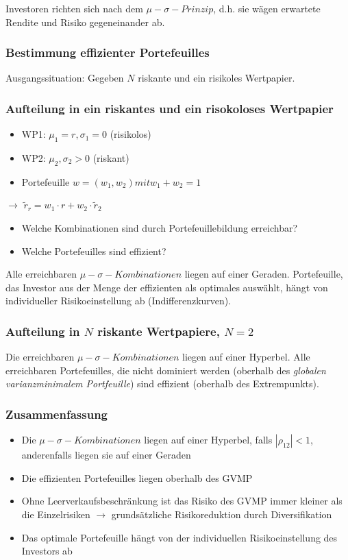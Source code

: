 Investoren richten sich nach dem \(\mu-\sigma-Prinzip\), d.h. sie wägen erwartete Rendite und Risiko gegeneinander ab.

\subsubsection{Bestimmung effizienter Portefeuilles}

Ausgangssituation: Gegeben \(N\) riskante und ein risikoles Wertpapier.

\subsubsection{Aufteilung in ein riskantes und ein risokoloses Wertpapier}
\begin{itemize}
	\item WP1: \(\mu_1 = r, \sigma_1 = 0\) (risikolos)
	\item WP2: \(\mu_2, \sigma_2 > 0\) (riskant)
	\item Portefeuille \(w = (w_1, w_2) mit w_1 + w_2 = 1\)
\end{itemize}

$\rightarrow$ \(\tilde{r}_r = w_1 \cdot r + w_2 \cdot \tilde{r}_2\)

\begin{itemize}
	\item Welche Kombinationen sind durch Portefeuillebildung erreichbar?
	\item Welche Portefeuilles sind effizient?
\end{itemize}
Alle erreichbaren \(\mu-\sigma-Kombinationen\) liegen auf einer Geraden.
Portefeuille, das Investor aus der Menge der effizienten als optimales auswählt, hängt von individueller Risikoeinstellung ab (Indifferenzkurven).

\subsubsection{Aufteilung in \(N\) riskante Wertpapiere, \(N = 2\)}
Die erreichbaren \(\mu-\sigma-Kombinationen\) liegen auf einer Hyperbel.
Alle erreichbaren Portefeuilles, die nicht dominiert werden (oberhalb des \textit{globalen varianzminimalem Portfeuille}) sind effizient (oberhalb des Extrempunkts).

\subsubsection{Zusammenfassung}
\begin{itemize}
	\item Die \(\mu-\sigma-Kombinationen\) liegen auf einer Hyperbel, falls \(|\rho_{12}| < 1\), anderenfalls liegen sie auf einer Geraden
	\item Die effizienten Portefeuilles liegen oberhalb des GVMP
	\item Ohne Leerverkaufsbeschränkung ist das Risiko des GVMP immer kleiner als die Einzelrisiken $\rightarrow$ grundsätzliche Risikoreduktion durch Diversifikation
	\item Das optimale Portefeuille hängt von der individuellen Risikoeinstellung des Investors ab
\end{itemize}


